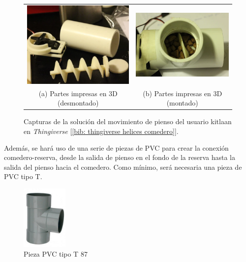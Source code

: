 \documentclass[12pt]{article}
\begin{document}
	\begin{figure}[h]
		\begin{center}
			\begin{tabular}{cc}
				\includegraphics[width=60mm]{img/thingiverse_helice_1.png} &   \includegraphics[width=60mm]{img/thingiverse_helice_2.png} \\
				(a) Partes impresas en 3D (desmontado) & (b) Partes impresas en 3D (montado)\\[6pt]
			\end{tabular}
			\caption{Capturas de la solución del movimiento de pienso del usuario kitlaan en \textit{Thingiverse} [\ref{bib: thingiverse helices comedero}].}
			\label{fig: capturas thingiverse helices kitlaan.}
		\end{center}
	\end{figure}
	
	\noindent Además, se hará uso de una serie de piezas de PVC para crear la conexión comedero-reserva, desde la salida de pienso en el fondo de la reserva hasta la salida del pienso hacia el comedero. Como mínimo, será necesaria una pieza de PVC tipo T.\\
	
	
	\begin{figure}[h!]
		\begin{center}
			\includegraphics[width=0.2\textwidth]{img/pieza_pvc_T.png}
			\caption{Pieza PVC tipo T 87\degree [\ref{bib: Nikoi ferreteria}]}
			\label{Pieza PVC T}
		\end{center}
	\end{figure}
	
\end{document}
